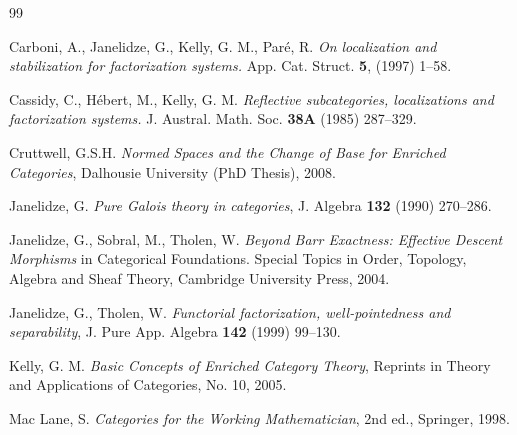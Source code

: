 \documentclass[12pt,a4paper]{amsart}
\theoremstyle{definition}
\begin{document}
\begin{thebibliography}{99}

Carboni, A., Janelidze, G., Kelly, G. M., Par\'{e}, R. \emph{On localization and stabilization for factorization systems.} App. Cat. Struct. \textbf{5}, (1997) 1--58.

Cassidy, C., H\'{e}bert, M., Kelly, G. M. \emph{Reflective subcategories, localizations and factorization systems.} J. Austral. Math. Soc. \textbf{38A} (1985) 287--329.

Cruttwell, G.S.H. \emph{Normed Spaces and the Change of Base for Enriched Categories}, Dalhousie University (PhD Thesis), 2008.




Janelidze, G. \emph{Pure Galois theory in categories}, J. Algebra \textbf{132} (1990) 270--286.

Janelidze, G., Sobral, M., Tholen, W. \emph{Beyond Barr Exactness: Effective Descent
Morphisms} in Categorical Foundations. Special Topics in Order,
Topology, Algebra and Sheaf Theory, Cambridge University Press,
2004.


Janelidze, G., Tholen, W. \emph{Functorial factorization,
well-pointedness and separability}, J. Pure App. Algebra
\textbf{142} (1999) 99--130.

Kelly, G. M. \emph{Basic Concepts of Enriched Category Theory}, Reprints in Theory and Applications of Categories, No. 10, 2005.

Mac Lane, S. \emph{Categories for the Working Mathematician}, 2nd ed., Springer, 1998.



\end{thebibliography}
\end{document}

